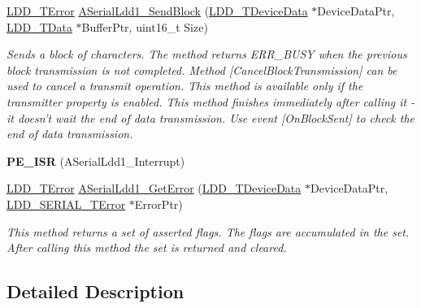 \begin{DoxyCompactItemize}
\hyperlink{group___p_e___types__module_ga24c2b045fd04e79e85f261ce4df35588}{L\-D\-D\-\_\-\-T\-Error} \hyperlink{group___a_serial_ldd1__module_gad73f06e0eda26a76d0ec611a50e16b1d}{A\-Serial\-Ldd1\-\_\-\-Send\-Block} (\hyperlink{group___p_e___types__module_gac5cf1362f1f0e3a2ce71b1bf2276d091}{L\-D\-D\-\_\-\-T\-Device\-Data} $\ast$Device\-Data\-Ptr, \hyperlink{group___p_e___types__module_gade8ef9401405bd941b6da738b807f980}{L\-D\-D\-\_\-\-T\-Data} $\ast$Buffer\-Ptr, uint16\-\_\-t Size)
\begin{DoxyCompactList}\small\item\em Sends a block of characters. The method returns E\-R\-R\-\_\-\-B\-U\-S\-Y when the previous block transmission is not completed. Method \mbox{[}Cancel\-Block\-Transmission\mbox{]} can be used to cancel a transmit operation. This method is available only if the transmitter property is enabled. This method finishes immediately after calling it -\/ it doesn't wait the end of data transmission. Use event \mbox{[}On\-Block\-Sent\mbox{]} to check the end of data transmission. \end{DoxyCompactList}\item 
\hypertarget{group___a_serial_ldd1__module_gaef4af12ca5f10beafaceb800c3c7d40c}{{\bfseries P\-E\-\_\-\-I\-S\-R} (A\-Serial\-Ldd1\-\_\-\-Interrupt)}\label{group___a_serial_ldd1__module_gaef4af12ca5f10beafaceb800c3c7d40c}

\item 
\hyperlink{group___p_e___types__module_ga24c2b045fd04e79e85f261ce4df35588}{L\-D\-D\-\_\-\-T\-Error} \hyperlink{group___a_serial_ldd1__module_gaac860ccc68e9f89fb25d97ae0c56bd87}{A\-Serial\-Ldd1\-\_\-\-Get\-Error} (\hyperlink{group___p_e___types__module_gac5cf1362f1f0e3a2ce71b1bf2276d091}{L\-D\-D\-\_\-\-T\-Device\-Data} $\ast$Device\-Data\-Ptr, \hyperlink{group___p_e___types__module_ga3bd5d57e02458ce220540d0ad0462e06}{L\-D\-D\-\_\-\-S\-E\-R\-I\-A\-L\-\_\-\-T\-Error} $\ast$Error\-Ptr)
\begin{DoxyCompactList}\small\item\em This method returns a set of asserted flags. The flags are accumulated in the set. After calling this method the set is returned and cleared. \end{DoxyCompactList}\end{DoxyCompactItemize}


\subsection{Detailed Description}


